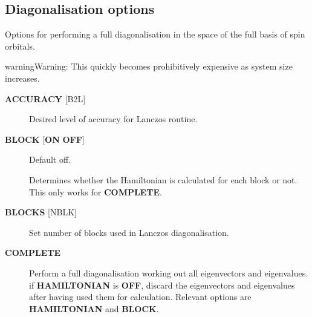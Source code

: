 \documentclass[openany,a4paper,10pt,english]{manual}
\begin{document}
\subsection{Diagonalisation options}

Options for performing a full diagonalisation in the space of the full
basis of spin orbitals.

\begin{notice}{warning}{Warning:}
This quickly becomes prohibitively expensive as system size increases.
\end{notice}
\begin{description}
\item[\textbf{ACCURACY} {[}B2L{]}] \leavevmode
Desired level of accuracy for Lanczos routine.

\item[\textbf{BLOCK} {[}\textbf{ON} \textbf{OFF}{]}] \leavevmode
Default off.

Determines whether the Hamiltonian is calculated for each block
or not.  This only works for \textbf{COMPLETE}.

\item[\textbf{BLOCKS} {[}NBLK{]}] \leavevmode
Set number of blocks used in Lanczos diagonalisation.

\item[\textbf{COMPLETE}] \leavevmode
Perform a full diagonalisation working out all eigenvectors
and eigenvalues.  if \textbf{HAMILTONIAN} is \textbf{OFF}, discard the
eigenvectors and eigenvalues after having used them for calculation.
Relevant options are \textbf{HAMILTONIAN} and \textbf{BLOCK}.

\end{description}
\end{document}
